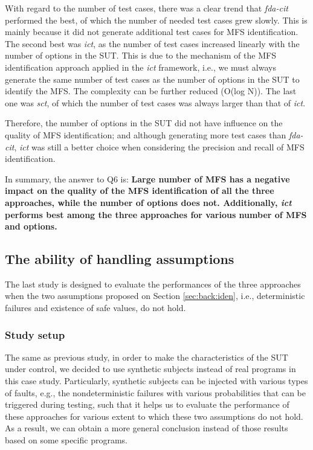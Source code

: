 \documentclass[10pt,journal,compsoc]{IEEEtran}
\begin{document}
With regard to the number of test cases, there was a clear trend that \emph{fda-cit} performed the best, of which the number of needed test cases grew slowly. This is mainly because it did not generate additional test cases for MFS identification. The second best was \emph{ict}, as the number of test cases increased linearly with the number of options in the SUT. This is due to the mechanism of the MFS identification approach applied in the \emph{ict} framework, i.e., we must always generate the same number of test cases as the number of options in the SUT to identify the MFS. The complexity can be further reduced (O(log N)\cite{zhang2011characterizing,li2012improved,niu2013identifying}). The last one was \emph{sct}, of which the number of test cases was always larger than that of \emph{ict}.

Therefore, the number of options in the SUT did not have influence on the quality of MFS identification; and although generating more test cases than \emph{fda-cit}, \emph{ict} was still a better choice when considering the precision and recall of MFS identification.

In summary, the answer to Q6 is:
\textbf{Large number of MFS has a negative impact on the quality of the MFS identification of all the three approaches, while the number of options does not. Additionally, \emph{ict} performs best among the three approaches for various number of MFS and options.}

\subsection{The ability of handling assumptions}
The last study is designed to evaluate the performances of the three approaches when the two assumptions proposed on Section \ref{sec:back:iden}, i.e., deterministic failures and existence of safe values,  do not hold.

\subsubsection{Study setup}
The same as previous study, in order to make the characteristics of the SUT under control, we decided to use synthetic subjects instead of real programs in this case study. Particularly, synthetic subjects can be injected with various types of faults, e.g., the nondeterministic failures with various probabilities that can be triggered during testing, such that it helps us to evaluate the performance of these approaches for various extent to which these two assumptions do not hold. As a result, we can obtain a more general conclusion instead of those results based on some specific programs.
\end{document}
